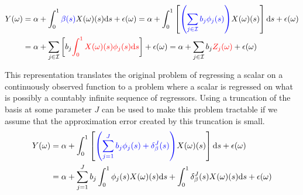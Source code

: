 \documentclass[11pt,twoside,a4paper]{article}
\begin{document}
	\begin{equation}
		\begin{split}
			Y(\omega) & = \alpha + \int_{0}^{1} {\color{blue}\beta(s)} X(\omega)(s)\mathrm{d}s + \epsilon(\omega)
			= \alpha + \int_{0}^{1}\left[{\color{blue}\left(\sum_{j \in \mathcal{I}} b_j \phi_j(s)\right)} X(\omega)(s) \right]\mathrm{d}s + \epsilon(\omega) \\
			& = \alpha + \sum_{j \in \mathcal{I}} \left[b_j \textcolor{red}{\int_{0}^{1} X(\omega)(s) \phi_j(s)\mathrm{d}s}\right] + \epsilon(\omega)
		      = \alpha + \sum_{j \in \mathcal{I}} b_j \textcolor{red}{Z_j(\omega)} + \epsilon(\omega)
		\end{split}
	\end{equation}
	
	This representation translates the original problem of regressing a scalar on a continuously observed function to a problem where a scalar is regressed on what is possibly a countably infinite sequence of regressors. Using a truncation of the basis at some parameter $J$ can be used to make this problem tractable if we assume that the approximation error created by this truncation is small.
	\begin{equation}
		\begin{split}
			Y(\omega) & = \alpha + \int_{0}^{1}\left[{\color{blue}\left(\sum_{j = 1}^{J} b_j \phi_j(s) + \delta_{\beta}^{J}(s)\right)} X(\omega)(s) \right]\mathrm{d}s + \epsilon(\omega) \\
			& = \alpha + \sum_{j = 1}^{J} b_j \int_{0}^{1} \phi_j(s) X(\omega)(s) \mathrm{d}s +  \int_{0}^{1} \delta_{\beta}^{J}(s) X(\omega)(s) \mathrm{d}s + \epsilon(\omega)
		\end{split}
	\end{equation}
\end{document}
